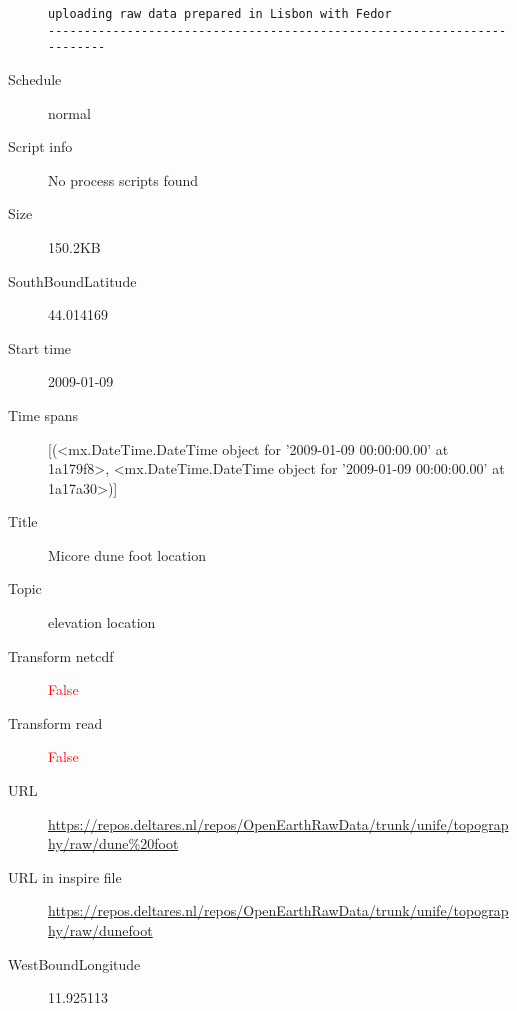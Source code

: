 \documentclass[9]{report}
\begin{document}
\begin{description}
\begin{verbatim}
uploading raw data prepared in Lisbon with Fedor
------------------------------------------------------------------------

\end{verbatim}
  \item[Schedule] normal
  \item[Script info] No process scripts found
  \item[Size] 150.2KB
  \item[SouthBoundLatitude] 44.014169
  \item[Start time] 2009-01-09
  \item[Time spans] [(<mx.DateTime.DateTime object for '2009-01-09 00:00:00.00' at 1a179f8>, <mx.DateTime.DateTime object for '2009-01-09 00:00:00.00' at 1a17a30>)]
  \item[Title]  Micore dune foot location 
  \item[Topic] elevation location
  \item[Transform netcdf] \textcolor{red}{False}
  \item[Transform read] \textcolor{red}{False}
  \item[URL] \href{https://repos.deltares.nl/repos/OpenEarthRawData/trunk/unife/topography/raw/dune\%20foot}{https://repos.deltares.nl/repos/OpenEarthRawData/trunk/unife/topography/raw/dune\%20foot}
  \item[URL in inspire file] \href{https://repos.deltares.nl/repos/OpenEarthRawData/trunk/unife/topography/raw/dunefoot}{https://repos.deltares.nl/repos/OpenEarthRawData/trunk/unife/topography/raw/dunefoot}
  \item[WestBoundLongitude] 11.925113
\end{description}
\end{document}
